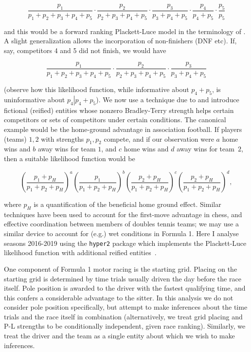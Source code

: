 \documentclass{elsarticle}
\begin{document}
\begin{equation}\label{competitors_1_to_5_likelihood}
\frac{p_1}{p_1+p_2+p_3+p_4+p_5}\cdot
\frac{p_2}{p_2+p_3+p_4+p_5}\cdot
\frac{p_3}{p_3+p_4+p_5}\cdot
\frac{p_4}{p_4+p_5}\cdot
\frac{p_5}{p_5}
\end{equation}

and this would be a forward ranking Plackett-Luce model in the
terminology of \cite{mollica2014}. A slight generalization allows the
incorporation of non-finishers (DNF etc). If, say, competitors 4 and 5
did not finish, we would have

\begin{equation}\label{competitors_1_to_3_only_finished}
\frac{p_1}{p_1+p_2+p_3+p_4+p_5}\cdot
\frac{p_2}{p_2+p_3+p_4+p_5}\cdot
\frac{p_3}{p_3+p_4+p_5}
\end{equation}

(observe how this likelihood function, while informative about
$p_4+p_5$, is uninformative about $p_4\left|p_4+p_5\right.$). We now
use a technique due to \cite{hankin2010,hankin2020} and introduce
fictional (reified) entities whose nonzero Bradley-Terry strength
helps certain competitors or sets of competitors under certain
conditions. The canonical example would be the home-ground advantage
in association football.  If players (teams) $1,2$ with strengths
$p_1,p_2$ compete, and if our observation were $a$ home wins and $b$
away wins for team $1$, and $c$ home wins and $d$ away wins for
team~$2$, then a suitable likelihood function would be

\[
\left(\frac{p_1+p_H}{p_1+p_2+p_H}\right)^a
\left(\frac{p_1}{p_1+p_2+p_H}\right)^b
\left(\frac{p_2+p_H}{p_1+p_2+p_H}\right)^c
\left(\frac{p_2+p_H}{p_1+p_2+p_H}\right)^d,
\]

\noindent where $p_H$ is a quantification of the beneficial home
ground effect.  Similar techniques have been used to account for the
first-move advantage in chess, and effective coordination between
members of doubles tennis teams; we may use a similar device to
account for (e.g.) wet conditions in Formula 1.  Here I analyse
seasons 2016-2019 using the \texttt{hyper2} package \citep{hankin2017}
which implements the Plackett-Luce likelihood function with additional
reified entities~\cite{hankin2020}.

One component of Formula 1 motor racing is the starting grid.  Placing
on the starting grid is determined by time trials usually driven the
day before the race itself.  Pole position is awarded to the driver
with the fastest qualifying time, and this confers a considerable
advantage to the sitter.  In this analysis we do not consider pole
position specifically, but attempt to make inferences about the time
trials and the race itself in combination (alternatively, we treat
grid placing and P-L strengths to be conditionally independent, given
race ranking).  Similarly, we treat the driver and the team as a
single entity about which we wish to make inferences.
\end{document}
